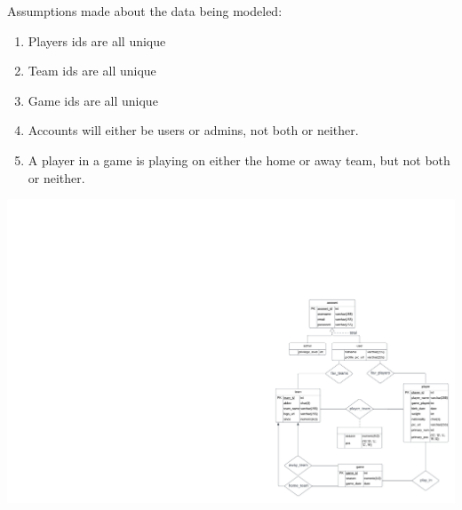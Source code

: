 \documentclass[11pt]{article}
\begin{document}
Assumptions made about the data being modeled:
\begin{enumerate}
    \item Players ids are all unique
    \item Team ids are all unique
    \item Game ids are all unique
    \item Accounts will either be users or admins, not both or neither.
    \item A player in a game is playing on either the home or away team, but not both or neither.
\end{enumerate}

\begin{center}
    \includegraphics[width=1\textwidth]{E_R Diagram.png}
\end{center}
\end{document}
